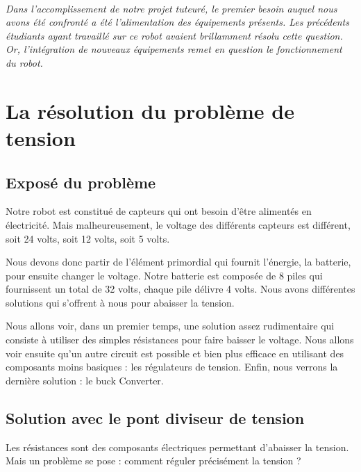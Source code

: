 \documentclass{PackagerQualityN}
\begin{document}

\newp       %
\paragraph{}
\textit{Dans l’accomplissement de notre projet tuteuré, le premier besoin auquel nous avons été confronté a été l'alimentation des équipements présents. Les précédents étudiants ayant travaillé sur ce robot avaient brillamment résolu cette question.
Or, l’intégration de nouveaux équipements remet en question le fonctionnement du robot.}




\section{La résolution du problème de tension}



\subsection{Exposé du problème}
Notre robot est constitué de capteurs qui ont besoin d’être alimentés en électricité. Mais malheureusement, le voltage des différents capteurs est différent, soit 24 volts, soit 12 volts, soit 5 volts.

Nous devons donc partir de l’élément primordial qui fournit l’énergie, la batterie, pour ensuite changer le voltage. Notre batterie est composée de 8 piles qui fournissent un total de 32 volts, chaque pile délivre 4 volts.
Nous avons différentes solutions qui s’offrent à nous pour abaisser la tension.

Nous allons voir, dans un premier temps, une solution assez rudimentaire qui consiste à utiliser des simples résistances pour faire baisser le voltage.
Nous allons voir ensuite qu'un autre circuit est possible et bien plus efficace en utilisant des composants moins basiques : les régulateurs de tension.
Enfin, nous verrons la dernière solution : le buck Converter.

\subsection{Solution avec le pont diviseur de tension}
Les résistances sont des composants électriques permettant d’abaisser la tension.
Mais un problème se pose : comment réguler précisément la tension ?
\end{document}
